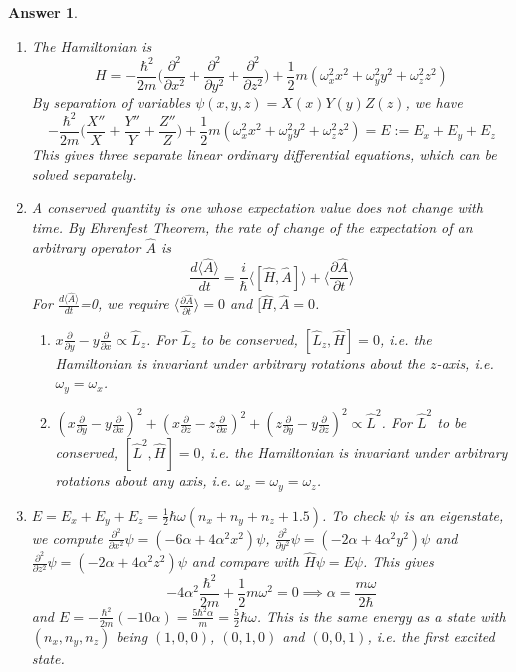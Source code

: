 \documentclass[a4paper]{article}
\newtheorem{ans}{Answer}[subsection]
\theoremstyle{new}
\begin{document}
\begin{ans}\leavevmode
\begin{enumerate}[label=(\alph*)]
\item The Hamiltonian is
$$H=-\frac{\hbar^2}{2m}\bigg(\frac{\partial^2}{\partial x^2}+\frac{\partial^2}{\partial y^2}+\frac{\partial^2}{\partial z^2}\bigg)+\frac{1}{2}m(\omega_x^2x^2+\omega_y^2y^2+\omega_z^2z^2)$$
By separation of variables $\psi(x,y,z)=X(x)Y(y)Z(z)$, we have
$$-\frac{\hbar^2}{2m}\bigg(\frac{X''}{X}+\frac{Y''}{Y}+\frac{Z''}{Z}\bigg)+\frac{1}{2}m(\omega_x^2x^2+\omega_y^2y^2+\omega_z^2z^2)=E:=E_x+E_y+E_z$$
This gives three separate linear ordinary differential equations, which can be solved separately.
\item A conserved quantity is one whose expectation value does not change with time. By Ehrenfest Theorem, the rate of change of the expectation of an arbitrary operator $\hat{A}$ is
$$\frac{d\langle\hat{A}\rangle}{dt}=\frac{i}{\hbar}\langle[\hat{H},\hat{A}]\rangle+\bigg\langle\frac{\partial\hat{A}}{\partial t}\bigg\rangle$$
For $\frac{d\langle\hat{A}\rangle}{dt}$=0, we require $\langle\frac{\partial\hat{A}}{\partial t}\rangle=0$ and $[\hat{H},\hat{A}=0$.
\begin{enumerate}[label=(\roman*)]
    \item $x\frac{\partial}{\partial y}-y\frac{\partial}{\partial x}\propto\hat{L}_z$. For $\hat{L}_z$ to be conserved, $[\hat{L}_z,\hat{H}]=0$, i.e. the Hamiltonian is invariant under arbitrary rotations about the $z$-axis, i.e. $\omega_y=\omega_x$.
    \item $(x\frac{\partial}{\partial y}-y\frac{\partial}{\partial x})^2+(x\frac{\partial}{\partial z}-z\frac{\partial}{\partial x})^2+(z\frac{\partial}{\partial y}-y\frac{\partial}{\partial z})^2\propto\hat{L}^2$. For $\hat{L}^2$ to be conserved, $[\hat{L}^2,\hat{H}]=0$, i.e. the Hamiltonian is invariant under arbitrary rotations about any axis, i.e. $\omega_x=\omega_y=\omega_z$.
\end{enumerate}
\item $E=E_x+E_y+E_z=\frac{1}{2}\hbar\omega(n_x+n_y+n_z+1.5)$. To check $\psi$ is an eigenstate, we compute $\frac{\partial^2}{\partial x^2}\psi=(-6\alpha+4\alpha^2x^2)\psi$, $\frac{\partial^2}{\partial y^2}\psi=(-2\alpha+4\alpha^2y^2)\psi$ and $\frac{\partial^2}{\partial z^2}\psi=(-2\alpha+4\alpha^2z^2)\psi$ and compare with $\hat{H}\psi=E\psi$. This gives 
$$-4\alpha^2\frac{\hbar^2}{2m}+\frac{1}{2}m\omega^2=0\implies\alpha=\frac{m\omega}{2\hbar}$$
and $E=-\frac{\hbar^2}{2m}(-10\alpha)=\frac{5\hbar^2\alpha}{m}=\frac{5}{2}\hbar\omega$. This is the same energy as a state with $(n_x,n_y,n_z)$ being $(1,0,0)$, $(0,1,0)$ and $(0,0,1)$, i.e. the first excited state.

\end{enumerate}
\end{ans}
\end{document}
